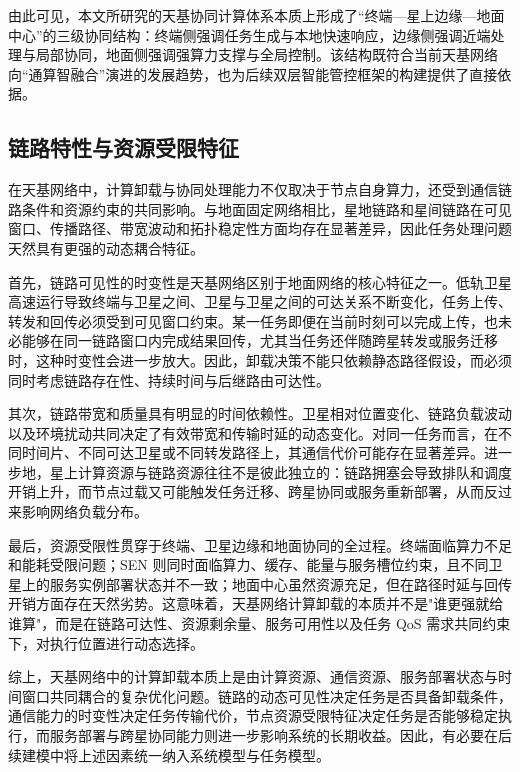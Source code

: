 由此可见，本文所研究的天基协同计算体系本质上形成了“终端—星上边缘—地面中心”的三级协同结构：终端侧强调任务生成与本地快速响应，边缘侧强调近端处理与局部协同，地面侧强调强算力支撑与全局控制。该结构既符合当前天基网络向“通算智融合”演进的发展趋势，也为后续双层智能管控框架的构建提供了直接依据。

\subsection{链路特性与资源受限特征}

在天基网络中，计算卸载与协同处理能力不仅取决于节点自身算力，还受到通信链路条件和资源约束的共同影响。与地面固定网络相比，星地链路和星间链路在可见窗口、传播路径、带宽波动和拓扑稳定性方面均存在显著差异，因此任务处理问题天然具有更强的动态耦合特征\cite{Zhou2024MobilityAware,Yin2025OECSurvey}。

首先，链路可见性的时变性是天基网络区别于地面网络的核心特征之一。低轨卫星高速运行导致终端与卫星之间、卫星与卫星之间的可达关系不断变化，任务上传、转发和回传必须受到可见窗口约束。某一任务即便在当前时刻可以完成上传，也未必能够在同一链路窗口内完成结果回传，尤其当任务还伴随跨星转发或服务迁移时，这种时变性会进一步放大\cite{Zhou2024MobilityAware,Zhai2024SECO}。因此，卸载决策不能只依赖静态路径假设，而必须同时考虑链路存在性、持续时间与后继路由可达性。

其次，链路带宽和质量具有明显的时间依赖性。卫星相对位置变化、链路负载波动以及环境扰动共同决定了有效带宽和传输时延的动态变化。对同一任务而言，在不同时间片、不同可达卫星或不同转发路径上，其通信代价可能存在显著差异。进一步地，星上计算资源与链路资源往往不是彼此独立的：链路拥塞会导致排队和调度开销上升，而节点过载又可能触发任务迁移、跨星协同或服务重新部署，从而反过来影响网络负载分布\cite{Tang2024TwoTimescaleJSAC,Feng2026LatencyAware}。

最后，资源受限性贯穿于终端、卫星边缘和地面协同的全过程。终端面临算力不足和能耗受限问题；SEN 则同时面临算力、缓存、能量与服务槽位约束，且不同卫星上的服务实例部署状态并不一致；地面中心虽然资源充足，但在路径时延与回传开销方面存在天然劣势\cite{Fan2025SEI,Zhong2025HeterogeneousTVT,Liu2026DeviceSatelliteSatellite}。这意味着，天基网络计算卸载的本质并不是"谁更强就给谁算"，而是在链路可达性、资源剩余量、服务可用性以及任务 QoS 需求共同约束下，对执行位置进行动态选择。

综上，天基网络中的计算卸载本质上是由计算资源、通信资源、服务部署状态与时间窗口共同耦合的复杂优化问题。链路的动态可见性决定任务是否具备卸载条件，通信能力的时变性决定任务传输代价，节点资源受限特征决定任务是否能够稳定执行，而服务部署与跨星协同能力则进一步影响系统的长期收益。因此，有必要在后续建模中将上述因素统一纳入系统模型与任务模型。

